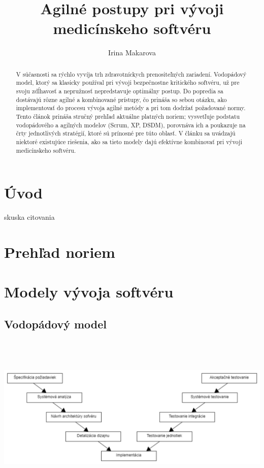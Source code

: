 \documentclass[10pt,twoside,slovak,a4paper]{article}
\title{Agilné postupy pri vývoji medicínskeho softvéru}
\author{Irina Makarova\\[2pt]}
\date{}
\begin{document}
\renewcommand{\abstractname}{\vspace{-\baselineskip}} %
\maketitle

\begin{abstract}
V súčasnosti sa rýchlo vyvíja trh zdravotníckych prenositeľných zariadení. Vodopádový model, ktorý sa klasicky používal pri vývoji bezpečnostne kritického softvéru, už pre svoju zdĺhavosť a nepružnosť nepredstavuje optimálny postup. Do popredia sa dostávajú rôzne agilné a kombinované prístupy, čo prináša so sebou otázku, ako implementovať do procesu vývoja agilné metódy a pri tom dodržať požadované normy. Tento článok prináša stručný prehľad aktuálne platných noriem; vysvetľuje podstatu vodopádového a agilných modelov (Scrum, XP, DSDM), porovnáva ich a poukazuje na črty jednotlivých stratégií, ktoré sú prínosné pre túto oblasť. V článku sa uvádzajú niektoré existujúce riešenia, ako sa tieto modely dajú efektívne kombinovať pri vývoji medicínskeho softvéru.
\end{abstract}

\section{Úvod} \label{uvod}
skuska citovania\cite{mccaffery2019}
\section{Prehľad noriem}
\section{Modely vývoja softvéru}
\subsection{Vodopádový model}
\includegraphics[width=15cm, height=8cm]{V-model.pdf}
\end{document}
